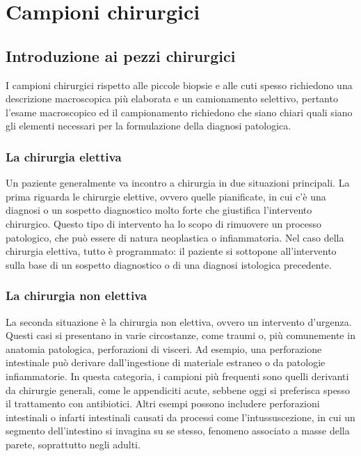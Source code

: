 \chapter{Campioni chirurgici}

\section{Introduzione ai pezzi chirurgici}
I campioni chirurgici rispetto alle piccole biopsie e alle cuti spesso richiedono una descrizione macroscopica più elaborata e un camionamento selettivo, pertanto l'esame macroscopico ed il campionamento richiedono che siano chiari quali siano gli elementi necessari per la formulazione della diagnosi patologica.

\subsection{La chirurgia elettiva}
Un paziente generalmente va incontro a chirurgia in due situazioni principali. La prima riguarda le chirurgie elettive, ovvero quelle pianificate, in cui c'è una diagnosi o un sospetto diagnostico molto forte che giustifica l’intervento chirurgico. Questo tipo di intervento ha lo scopo di rimuovere un processo patologico, che può essere di natura neoplastica o infiammatoria. Nel caso della chirurgia elettiva, tutto è programmato: il paziente si sottopone all’intervento sulla base di un sospetto diagnostico o di una diagnosi istologica precedente.

\subsection{La chirurgia non elettiva}
La seconda situazione è la chirurgia non elettiva, ovvero un intervento d'urgenza. Questi casi si presentano in varie circostanze, come traumi o, più comunemente in anatomia patologica, perforazioni di visceri. Ad esempio, una perforazione intestinale può derivare dall'ingestione di materiale estraneo o da patologie infiammatorie. In questa categoria, i campioni più frequenti sono quelli derivanti da chirurgie generali, come le appendiciti acute, sebbene oggi si preferisca spesso il trattamento con antibiotici. Altri esempi possono includere perforazioni intestinali o infarti intestinali causati da processi come l'intussuscezione, in cui un segmento dell'intestino si invagina su se stesso, fenomeno associato a masse della parete, soprattutto negli adulti.

